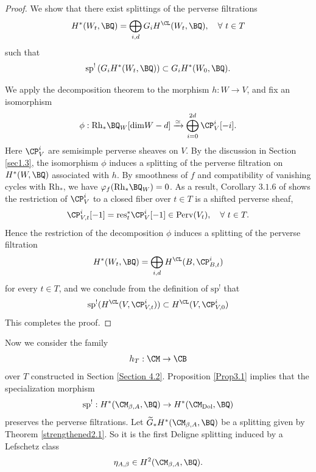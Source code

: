 \begin{proof}
We show that there exist splittings of the perverse filtrations
\[
H^*(W_t, \BQ) = \bigoplus_{i,d}G_iH^\CL(W_t, \BQ), \quad \forall~ t \in T
\]
such that
\begin{equation*}
\mathrm{sp}^!\left(G_iH^*(W_t ,\BQ)\right) \subset G_iH^*(W_0, \BQ).
\end{equation*}

We apply the decomposition theorem \cite{BBD} to the morphism $h: W \to V$, and fix an isomorphism
\[
\phi: \mathrm{Rh}_\ast \BQ_W [\mathrm{dim}W - d] \xrightarrow{\simeq} \bigoplus_{i=0}^{2d} \CP_V^i [-i].
\]
Here $\CP_V^i$ are semisimple perverse sheaves on $V$. By the discussion in Section \ref{sec1.3}, the isomorphism $\phi$ induces a splitting of the perverse filtration on $H^*(W, \BQ)$ associated with $h$. By smoothness of $f$ and compatibility of vanishing cycles with $\mathrm{Rh}_*$, we have $\varphi_f(\mathrm{Rh}_\ast \BQ_W) = 0$.  As a result, Corollary $3.1.6$ of \cite{dCM} shows the restriction of $\CP_V^i$ to a closed fiber over $t\in T$ is a shifted perverse sheaf,
\[
\CP_{V,t}^i [-1] = \mathrm{res}_t^*\CP_V^i [-1] \in \mathrm{Perv}(V_t), \quad \forall~ t\in T.
\]
Hence the restriction of the decomposition $\phi$ induces a splitting of the perverse filtration
\[
H^*(W_t, \BQ) = \bigoplus_{i,d}H^\CL(B, \CP_{B,t}^i)
\]
for every $t\in T$, and we conclude from the definition of $\mathrm{sp}^!$ that
\[
\mathrm{sp}^! (H^\CL(V, \CP_{V,t}^i)) \subset H^\CL(V, \CP_{V,0}^i)
\]
This completes the proof.
\end{proof}

Now we consider the family
\[
h_T: \CM \to  \CB
\]
over $T$ constructed in Section \ref{Section 4.2}. Proposition \ref{Prop3.1} implies that the specialization morphism
\[
\mathrm{sp}^!: H^*(\CM_{\beta, A}, \BQ) \to H^*(\CM_{\mathrm{Dol}}, \BQ)
\]
preserves the perverse filtrations. Let $\widetilde{G}_*H^*(\CM_{\beta,A}, \BQ)$ be a splitting given by Theorem \ref{strengthened2.1}. So it is the first Deligne splitting induced by a Lefschetz class
\[
\eta_{A,\beta} \in H^2(\CM_{\beta,A}, \BQ).
\]

